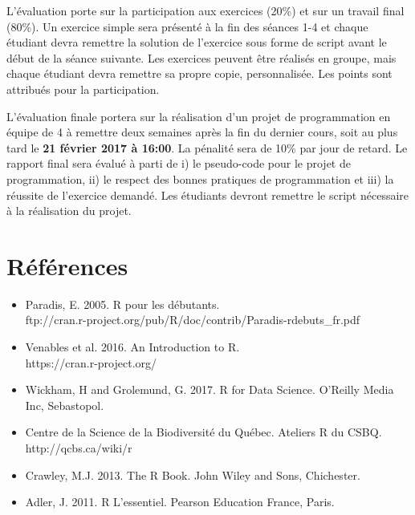 \documentclass[12]{article}
\begin{document}
	L'évaluation porte sur la participation aux exercices (20\%) et sur un
	travail final (80\%). Un exercice simple sera présenté à la fin des
	séances 1-4 et chaque étudiant devra remettre la solution de l'exercice sous
	forme de script avant le début de la séance suivante. Les exercices
	peuvent être réalisés en groupe, mais chaque étudiant devra remettre sa
	propre copie, personnalisée. Les points sont attribués pour la
	participation.

	L'évaluation finale portera sur la réalisation d'un projet de
	programmation en équipe de 4 à remettre deux semaines après la fin du
	dernier cours, soit au plus tard le \textbf{21 février 2017 à 16:00}. La
	pénalité sera de 10\% par jour de retard. Le rapport final sera évalué à
	parti de i) le pseudo-code pour le projet de programmation, ii) le respect
	des bonnes pratiques de programmation et iii) la réussite de l'exercice
	demandé. Les étudiants devront remettre le script nécessaire à la
	réalisation du projet.

	\section*{Références}

	\begin{itemize}
	\renewcommand{\labelitemi}{$\bullet$}	

		\item Paradis, E. 2005. R pour les débutants. 
		\\ ftp://cran.r-project.org/pub/R/doc/contrib/Paradis-rdebuts\_fr.pdf

		\item Venables et al. 2016. An Introduction to R. 
		\\ https://cran.r-project.org/

		\item Wickham, H and Grolemund, G. 2017. R for Data Science. O'Reilly Media Inc, Sebastopol.  

		\item Centre de la Science de la Biodiversité du Québec. Ateliers R du CSBQ. \\ http://qcbs.ca/wiki/r

		\item Crawley, M.J. 2013. The R Book. John Wiley and Sons, Chichester.

		\item Adler, J. 2011. R L'essentiel. Pearson Education France, Paris.

	\end{itemize}
\end{document}
